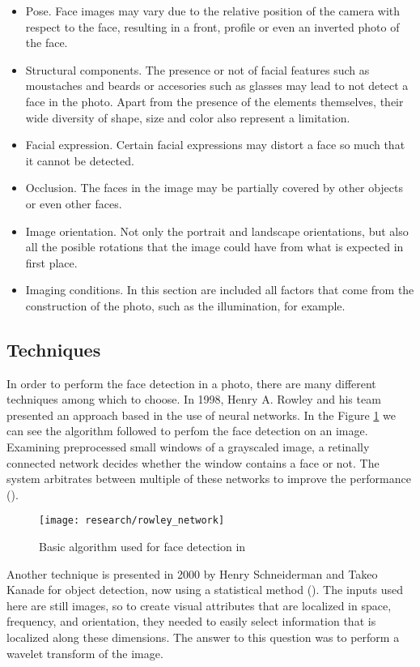 	\begin{itemize}
		\item Pose. Face images may vary due to the relative position of the camera with respect to the face, resulting in a front, profile or even an inverted photo of the face.  
		\item Structural components. The presence or not of facial features such as moustaches and beards or accesories such as glasses may lead to not detect a face in the photo. Apart from the presence of the elements themselves, their wide diversity of shape, size and color also represent a limitation.  
		\item Facial expression. Certain facial expressions may distort a face so much that it cannot be detected.    
		\item Occlusion. The faces in the image may be partially covered by other objects or even other faces.
		\item Image orientation. Not only the portrait and landscape orientations, but also all the posible rotations that the image could have from what is expected in first place.
		\item Imaging conditions. In this section are included all factors that come from the construction of the photo, such as the illumination, for example.  
	\end{itemize}

	\subsection{Techniques}
	\label{subsec:face_detec_techniques}
	In order to perform the face detection in a photo, there are many different techniques among which to choose. In 1998, Henry A. Rowley and his team presented an approach based in the use of neural networks. In the Figure \ref{fig:rowley_network} we can see the algorithm followed to perfom the face detection on an image. Examining preprocessed small windows of a grayscaled image, a retinally connected network decides whether the window contains a face or not. The system arbitrates between multiple of these networks to improve the performance (\cite{rowley1998neural}). 

	\begin{figure}[!ht]
		\centering
		\texttt{[image: research/rowley\_network]}
		\caption{Basic algorithm used for face detection in \cite{rowley1998neural}}
		\label{fig:rowley_network}
	\end{figure}

	Another technique is presented in 2000 by Henry Schneiderman and Takeo Kanade for object detection, now using a statistical method (\cite{schneiderman2000statistical}). The inputs used here are still images, so to create visual attributes that are localized in space, frequency, and orientation, they needed to easily select information that is localized along these dimensions. The answer to this question was to perform a wavelet transform of the image. 

